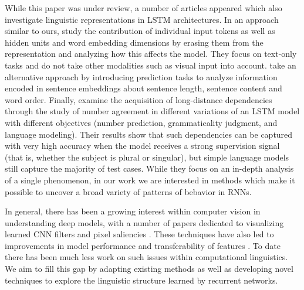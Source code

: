 While this paper was under review, a number of articles appeared which also 
investigate linguistic representations in LSTM architectures. In an 
approach similar to ours,  study the contribution of 
individual input tokens as well as hidden units and word embedding dimensions 
by erasing them from the representation and analyzing how this affects the model.
They focus on text-only tasks and do not take other 
modalities such as visual input into account.
 take an alternative approach by introducing prediction tasks 
to analyze information encoded in sentence embeddings about sentence length, 
sentence content and word order. 
Finally,  examine 
the acquisition of long-distance dependencies through the study of number agreement 
in different variations of an LSTM model with different objectives (number prediction, 
grammaticality judgment, and language modeling). Their results show that such dependencies 
can be captured with very high accuracy when the model receives a strong supervision 
signal (that is, whether the subject is plural or singular), but simple language models still capture 
the majority of test cases. While they focus on an in-depth analysis of a single phenomenon, in our work
we are interested in methods which make it possible to uncover a broad variety of patterns of bebavior in RNNs.   

In general, there has been a growing interest within computer vision
in understanding deep models, with a number of papers dedicated to
visualizing learned CNN filters and pixel saliencies
\cite{simonyan2013deep,yosinski2015understanding,mahendran2015understanding}. These
techniques have also led to improvements in model performance
\cite{eigen2013understanding} and transferability of features
\cite{zhou2014object}. To date there has been much less work on such
issues within computational linguistics. We aim to fill this gap by
adapting existing methods as well as developing novel techniques to
explore the linguistic structure learned by recurrent networks.
